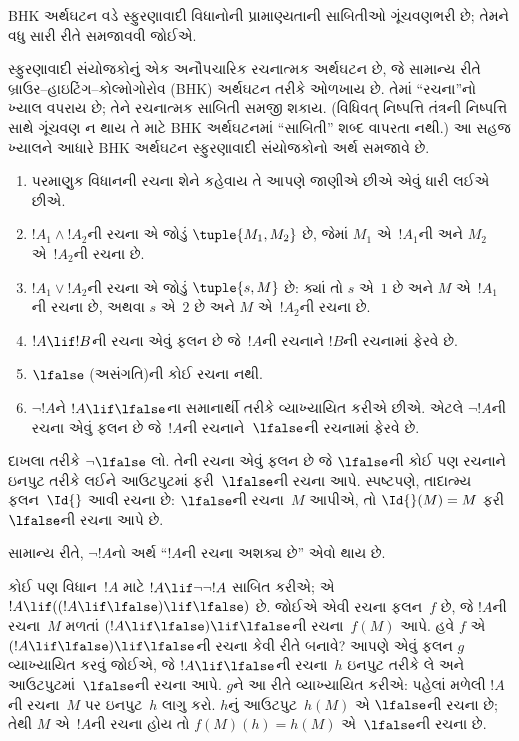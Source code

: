 \begingroup
\makeatletter{}\makeatother


\label{guunit:OLP-0495}


\begin{editorial}
  BHK અર્થઘટન વડે સ્ફુરણાવાદી વિધાનોની પ્રામાણ્યતાની
  સાબિતીઓ ગૂંચવણભરી છે; તેમને વધુ સારી રીતે સમજાવવી જોઈએ.
\end{editorial}

સ્ફુરણાવાદી સંયોજકોનું એક અનૌપચારિક રચનાત્મક અર્થઘટન છે, જે
સામાન્ય રીતે બ્રાઉર--હાઇટિંગ--કોલ્મોગોરોવ (BHK) અર્થઘટન તરીકે
ઓળખાય છે. તેમાં ``રચના''નો ખ્યાલ વપરાય છે; તેને રચનાત્મક
સાબિતી સમજી શકાય. (વિધિવત્ નિષ્પત્તિ તંત્રની
નિષ્પત્તિ સાથે ગૂંચવણ ન થાય તે માટે BHK અર્થઘટનમાં
``સાબિતી'' શબ્દ વાપરતા નથી.) આ સહજ ખ્યાલને આધારે BHK
અર્થઘટન સ્ફુરણાવાદી સંયોજકોનો અર્થ સમજાવે છે.

\begin{enumerate}
\item પરમાણુક વિધાનની રચના શેને કહેવાય તે આપણે જાણીએ છીએ એવું
  ધારી લઈએ છીએ.
\item $!A_1 \land !A_2$ની રચના એ જોડું $\tuple{M_1, M_2}$ છે,
  જેમાં $M_1$ એ~$!A_1$ની અને $M_2$ એ~$!A_2$ની રચના છે.
\item $!A_1 \lor !A_2$ની રચના એ જોડું $\tuple{s, M}$ છે:
  ક્યાં તો $s$ એ~$1$ છે અને $M$ એ~$!A_1$ની રચના છે, અથવા
  $s$ એ~$2$ છે અને $M$ એ~$!A_2$ની રચના છે.
\item $!A \lif !B$ની રચના એવું ફલન છે જે~$!A$ની રચનાને
  $!B$ની રચનામાં ફેરવે છે.
\item $\lfalse$ (અસંગતિ)ની કોઈ રચના નથી.
\item $\lnot !A$ને $!A \lif \lfalse$ના સમાનાર્થી તરીકે
  વ્યાખ્યાયિત કરીએ છીએ. એટલે $\lnot !A$ની રચના એવું ફલન છે
  જે~$!A$ની રચનાને~$\lfalse$ની રચનામાં ફેરવે છે.
\end{enumerate}

\begin{ex}
દાખલા તરીકે $\lnot \lfalse$ લો. તેની રચના એવું ફલન છે જે
$\lfalse$ની કોઈ પણ રચનાને ઇનપુટ તરીકે લઈને આઉટપુટમાં
ફરી~$\lfalse$ની રચના આપે. સ્પષ્ટપણે, તાદાત્મ્ય
ફલન~$\Id{}$ આવી રચના છે: $\lfalse$ની રચના~$M$ આપીએ,
તો $\Id{}(M) = M$ ફરી~$\lfalse$ની રચના આપે છે.
\end{ex}

સામાન્ય રીતે, $\lnot !A$નો અર્થ ``$!A$ની રચના અશક્ય છે'' એવો થાય છે.

\begin{ex}
કોઈ પણ વિધાન~$!A$ માટે $!A \lif \lnot \lnot !A$ સાબિત કરીએ;
એ $!A \lif ((!A \lif \lfalse) \lif \lfalse)$ છે. જોઈએ
એવી રચના ફલન~$f$ છે, જે $!A$ની રચના~$M$ મળતાં
$(!A \lif \lfalse) \lif \lfalse$ની રચના~$f(M)$ આપે.
હવે $f$ એ $(!A \lif \lfalse) \lif \lfalse$ની રચના કેવી
રીતે બનાવે? આપણે એવું ફલન $g$ વ્યાખ્યાયિત કરવું જોઈએ,
જે $!A \lif \lfalse$ની રચના~$h$ ઇનપુટ તરીકે લે અને
આઉટપુટમાં~$\lfalse$ની રચના આપે. $g$ને આ રીતે વ્યાખ્યાયિત
કરીએ: પહેલાં મળેલી $!A$ની રચના~$M$ પર ઇનપુટ~$h$ લાગુ કરો.
$h$નું આઉટપુટ~$h(M)$ એ $\lfalse$ની રચના છે; તેથી $M$
એ~$!A$ની રચના હોય તો $f(M)(h) = h(M)$ એ~$\lfalse$ની
રચના છે.
\end{ex}

